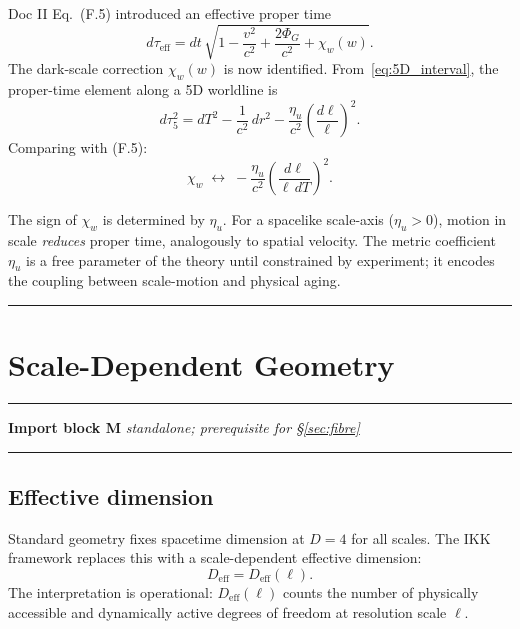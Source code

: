 \documentclass[11pt, a4paper, oneside]{article}
\theoremstyle{definition}
\theoremstyle{plain}
\theoremstyle{remark}
\newcommand{\dtaueff}{d\tau_{\mathrm{eff}}}
\begin{document}
Doc II Eq.~(F.5) introduced an effective proper time
\begin{equation}
  \dtaueff = dt\,\sqrt{1 - \frac{v^2}{c^2} + \frac{2\Phi_G}{c^2} + \chi_w(w)}.
  \tag{F.5}
\end{equation}
The dark-scale correction $\chi_w(w)$ is now identified.
From~\eqref{eq:5D_interval}, the proper-time element along a 5D worldline is
\begin{equation}
  d\tau_5^2 = dT^2 - \frac{1}{c^2}\,dr^2
              - \frac{\eta_u}{c^2}\left(\frac{d\ell}{\ell}\right)^2.
  \label{eq:proper_time_5D}
\end{equation}
Comparing with (F.5):
\begin{equation}
  \chi_w \;\longleftrightarrow\; -\frac{\eta_u}{c^2}\left(\frac{d\ell}{\ell\,dT}\right)^2.
  \label{eq:chi_w_identification}
\end{equation}

The sign of $\chi_w$ is determined by $\eta_u$.
For a spacelike scale-axis ($\eta_u > 0$), motion in scale
\emph{reduces} proper time, analogously to spatial velocity.
The metric coefficient $\eta_u$ is a free parameter of the theory
until constrained by experiment; it encodes the coupling between
scale-motion and physical aging.

\noindent\rule{\linewidth}{0.4pt}

\section{Scale-Dependent Geometry}
\label{sec:scale_geometry}

\noindent\rule{\linewidth}{0.8pt}
\textbf{Import block M} \hfill \textit{standalone; prerequisite for \S\ref{sec:fibre}}
\noindent\rule{\linewidth}{0.4pt}

\subsection{Effective dimension}

Standard geometry fixes spacetime dimension at $D = 4$ for all scales.
The IKK framework replaces this with a scale-dependent effective dimension:
\begin{equation}
  D_\mathrm{eff} = D_\mathrm{eff}(\ell).
  \label{eq:Deff}
\end{equation}
The interpretation is operational: $D_\mathrm{eff}(\ell)$ counts the
number of physically accessible and dynamically active degrees of
freedom at resolution scale $\ell$.
\end{document}
